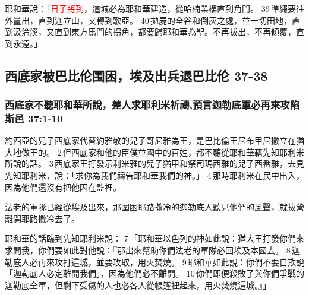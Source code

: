 耶和華說：「\textcolor{red}{日子將到}，這城必為耶和華建造，從哈楠業樓直到角門。 39 準繩要往外量出，直到迦立山，又轉到歌亞。 40 拋屍的全谷和倒灰之處，並一切田地，直到汲淪溪，又直到東方馬門的拐角，都要歸耶和華為聖。不再拔出，不再傾覆，直到永遠。」


\subsection{西底家被巴比伦围困，埃及出兵退巴比伦 37-38}
\subsubsection{西底家不聽耶和華所說，差人求耶利米祈禱,預言迦勒底軍必再來攻陷斯邑 37:1-10}
約西亞的兒子西底家代替約雅敬的兒子哥尼雅為王，是巴比倫王尼布甲尼撒立在猶大地做王的。 2 但西底家和他的臣僕並國中的百姓，都不聽從耶和華藉先知耶利米所說的話。
3 西底家王打發示利米雅的兒子猶甲和祭司瑪西雅的兒子西番雅，去見先知耶利米，說：「求你為我們禱告耶和華我們的神。」 4 那時耶利米在民中出入，因為他們還沒有把他囚在監裡。

法老的軍隊已經從埃及出來，那圍困耶路撒冷的迦勒底人聽見他們的風聲，就拔營離開耶路撒冷去了。

耶和華的話臨到先知耶利米說： 7 「耶和華以色列的神如此說：猶大王打發你們來求問我，你們要如此對他說：『那出來幫助你們法老的軍隊必回埃及本國去。 8 迦勒底人必再來攻打這城，並要攻取，用火焚燒。 9 耶和華如此說：你們不要自欺說「迦勒底人必定離開我們」，因為他們必不離開。 10 你們即便殺敗了與你們爭戰的迦勒底全軍，但剩下受傷的人也必各人從帳篷裡起來，用火焚燒這城。』」


